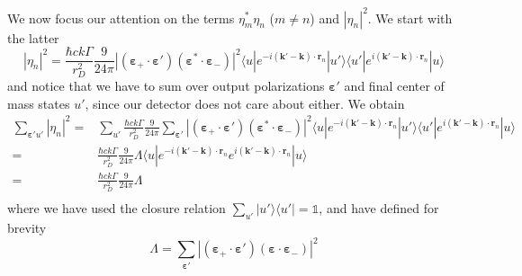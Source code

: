\documentclass[11pt,letter]{article}
\newcommand{\bv}[1]{\ensuremath{\bm{#1}}}
\begin{document}
We now focus our attention on the terms
$\eta_{m}^{*}\eta_{n}$ ($m\neq n$) and $|\eta_{n}|^{2}$.  We start with the latter 
\begin{equation}
 |\eta_{n}|^{2} =  \frac{\hbar c k \Gamma}{r_{D}^{2}}  
    \frac{9}{24\pi} 
       | (\bv{\varepsilon}_{+}\cdot \bv{\varepsilon}' )
                       (\bv{\varepsilon}^{*}\cdot \bv{\varepsilon}_{-} ) |^{2}
      \langle u | e^{-i(\bv{k}'-\bv{k}) \cdot\bv{r}_{n}} | u'  \rangle
      \langle u' | e^{i(\bv{k}'-\bv{k}) \cdot\bv{r}_{n}} | u  \rangle
\end{equation}
and notice that we have to sum over output polarizations $\bv{\varepsilon}'$
and final center of mass states  $u'$, since our detector does not care about
either. We obtain 
\begin{equation}
\begin{split}
 \sum_{\bv{\varepsilon}' u'}|\eta_{n}|^{2} = & 
    \sum_{ u'} \frac{\hbar c k \Gamma}{r_{D}^{2}}  
    \frac{9}{24\pi} 
      \sum_{\bv{\varepsilon}'} | (\bv{\varepsilon}_{+}\cdot \bv{\varepsilon}' )
                       (\bv{\varepsilon}^{*}\cdot \bv{\varepsilon}_{-} ) |^{2}
      \langle u | e^{-i(\bv{k}'-\bv{k}) \cdot\bv{r}_{n}} | u'  \rangle
      \langle u' | e^{i(\bv{k}'-\bv{k}) \cdot\bv{r}_{n}} | u  \rangle \\
 = & \frac{\hbar c k \Gamma}{r_{D}^{2}}  
    \frac{9}{24\pi} \Lambda 
      \langle u | e^{-i(\bv{k}'-\bv{k}) \cdot\bv{r}_{n}}  e^{i(\bv{k}'-\bv{k}) 
      \cdot\bv{r}_{n}} | u  \rangle \\
 = & \frac{\hbar c k \Gamma}{r_{D}^{2}}  
    \frac{9}{24\pi} \Lambda \\ 
\end{split}
\end{equation}
where we have used the closure relation $\sum_{u'}|u'\rangle\langle u'| =
\mathbb{1}$, and have defined for brevity 
\begin{equation}
 \Lambda = 
  \sum_{\bv{\varepsilon}' }
        | (\bv{\varepsilon}_{+}\cdot \bv{\varepsilon}' )
                        (\bv{\varepsilon}\cdot \bv{\varepsilon}_{-} ) |^{2} 
\end{equation} 
\end{document}
